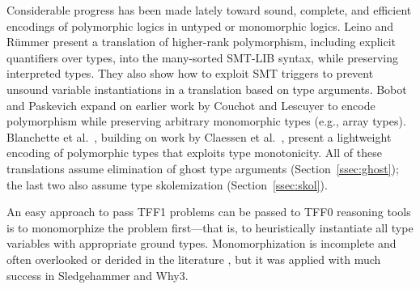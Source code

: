 Considerable progress has been made lately toward sound, complete, and efficient
encodings of polymorphic logics in untyped or monomorphic logics. Leino and
R\"ummer \cite{leino-ruemmer-2010} present a translation of higher-rank
polymorphism, including explicit quantifiers over types, into the many-sorted
SMT-LIB syntax, while preserving interpreted types. They also show how to
exploit SMT triggers to prevent unsound variable instantiations in a
translation based on type arguments. Bobot and Paskevich
\cite{bobot-paskevich-2011} expand on earlier work by Couchot and Lescuyer
\cite{couchot-lescuyer-2007} to encode polymorphism while preserving
arbitrary monomorphic types (e.g., array types).
Blanchette et
al.\ \cite{blanchette-et-al-2012-mono}, building on work by Claessen et al.\
\cite{claessen-et-al-2011}, present a %
lightweight encoding of
polymorphic types that exploits type monotonicity. All of these translations
assume %
elimination of ghost type arguments
(Section~\ref{ssec:ghost}); the last two also assume type skolemization
(Section~\ref{ssec:skol}).

An easy approach to pass TFF1 problems can be passed to TFF0
reasoning tools is to monomorphize the problem first---that is, to heuristically
instantiate all type variables with appropriate
ground types. Monomorphization is incomplete and often overlooked
or derided in the literature \cite[p.\ 3]{couchot-lescuyer-2007}, but it was
applied with much success in Sledgehammer \cite[\S6]{blanchette-et-al-2012-mono}
and Why3.
